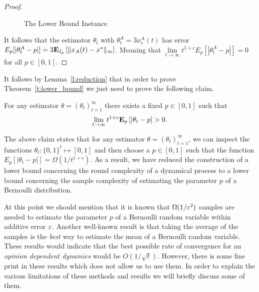 \begin{proof}
\begin{figure}
    \caption{The Lower Bound Instance} \label{fig:lb_instance}
  \end{figure}
  It follows that the estimator $\theta_t$ with $\theta_t^A = 3x_c^A(t)$
  has error $E_p[|\theta_t^A-p|]=3\bm{\mathrm{E}}_{I_p} \left[ \| x_A(t)-x^* \|_{\infty} \right]$.
  Meaning that $\lim\limits_{t \rightarrow \infty}t^{1+c}E_p[|\theta_t^A -p|]=0$ for all
  $p \in [0,1]$.
\end{proof}

\noindent It follows by Lemma~\ref{l:reduction} that in order to prove Theorem~\ref{t:lower_bound} we
just need to prove the following claim.

\begin{claim}\label{cl:fixed_p}
  For any estimator $\theta = (\theta_t)_{t=1}^\infty$
  there exists a fixed $p \in [0,1]$ such that
  \[
    \lim_{t \to \infty} t^{1+c} \bm{\mathrm{E}}_{p} \left[ |\theta_t - p \right] > 0.
  \]
\end{claim}
The above claim states that for any estimator $\theta=(\theta_t)_{t=1}^\infty$,
we can inspect the functions $\theta_t: \{0,1\}^t \mapsto [0,1]$ and then choose
a $p \in [0,1]$ such that the function $E_p[|\theta_t-p|]= \Omega(1/t^{1+c})$. As
a result, we have reduced the construction of a lower bound concerning the round
complexity of a dynamical process to a lower bound concerning the sample complexity of
estimating the parameter $p$ of a Bernoulli distribution.

At this point we should mention that it is known
that $\Omega(1/\varepsilon^2)$ samples are needed to estimate the parameter $p$
of a Bernoulli random variable within additive error $\varepsilon$.
Another well-known result is that taking the average of the samples
is the \emph{best} way to estimate the mean of a Bernoulli random variable.
These results would indicate that the best possible rate of convergence
for an \emph{opinion dependent dynamics} would be $O(1/\sqrt{t})$.
However, there is some fine print in these results which does not allow us
to use them. In order to explain the various limitations of
these methods and results we will briefly discuss some of them.

